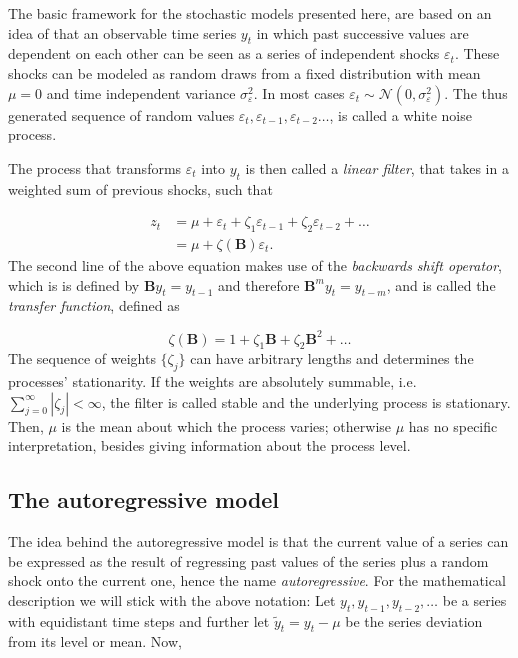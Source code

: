The basic framework for the stochastic models presented here, are based on an idea of \citet{yule1927vii} that an observable time series $y_t$ in which past successive values are dependent on each other can be seen as a series of independent shocks $\varepsilon_t$. These shocks can be modeled as random draws from a fixed distribution with mean $\mu = 0$ and time independent variance $\sigma^2_\varepsilon$. In most cases $\varepsilon_t \sim \mathcal{N} \left(0, \sigma^2_\varepsilon \right) $. The thus generated sequence of random values $\varepsilon_t, \varepsilon_{t-1}, \varepsilon_{t-2} \dots$, is called a white noise process.

The process that transforms $\varepsilon_t$ into $y_t$ is then called a \textit{linear filter}, that takes in a weighted sum of previous shocks, such that

\begin{equation}
        \label{linear-filter}
	\begin{aligned}
		z_{t} &=\mu+\varepsilon_{t}+\zeta_{1} \varepsilon_{t-1}+\zeta_{2} \varepsilon_{t-2}+ \dots \\
		&=\mu+\zeta(\boldsymbol{B}) \varepsilon_{t}.
	\end{aligned}
\end{equation}
%
The second line of the above equation makes use of the \textit{backwards shift operator}, which is is defined by $\boldsymbol{B} y_t = y_{t-1}$ and therefore $\boldsymbol{B}^m y_t = y_{t-m}$, and is called the \textit{transfer function}, defined as

\begin{equation*}
	\zeta(\boldsymbol{B})=1+\zeta_{1} \boldsymbol{B} + \zeta_{2} \boldsymbol{B}^{2}+\dots
\end{equation*}
%
The sequence of weights $\{\zeta_j\}$ can have arbitrary lengths and determines the processes' stationarity. If the weights are absolutely summable, i.e. $\sum_{j=0}^{\infty}\left|\zeta_{j}\right|<\infty$, the filter is called stable and the underlying process is stationary. Then, $\mu$ is the mean about which the process varies; otherwise $\mu$ has no specific interpretation, besides giving information about the process level.

\subsection{The autoregressive model}

The idea behind the autoregressive model is that the current value of a series can be expressed as the result of regressing past values of the series plus a random shock onto the current one, hence the name \textit{autoregressive}. For the mathematical description we will stick with the above notation: Let $y_t, y_{t-1}, y_{t-2},\dots$ be a series with equidistant time steps and further let $\tilde{y}_t = y_t - \mu$ be the series deviation from its level or mean. Now, 

